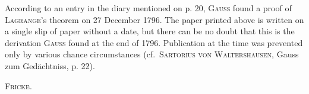 \noindent\hspace*{\parindent}According to an entry in the diary mentioned on p. 20, \textsc{Gauss} found a
proof of \textsc{Lagrange}'s theorem on 27 December 1796. The paper printed above is
written on a single slip of paper without a date, but there can be no doubt that this is
the derivation \textsc{Gauss} found at the end of 1796. Publication at the time was
prevented only by various chance circumstances
(cf.\ \textsc{Sartorius von Waltershausen}, Gauss zum Gedächtniss, p. 22).

\begin{flushright}
\textsc{Fricke}.
\end{flushright}
